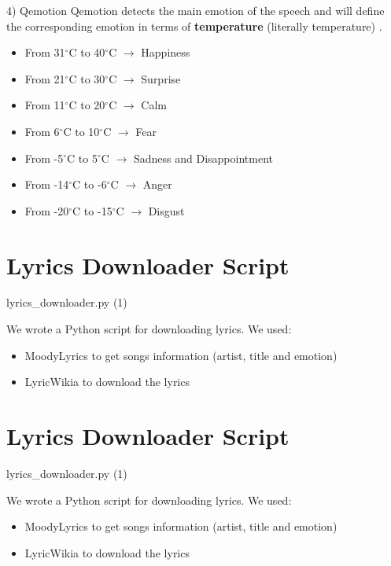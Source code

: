 \documentclass[xcolor=dvipsnames]{beamer}
\begin{document}
\begin{frame}{4) Qemotion}
Qemotion detects the main emotion of the speech and will define the corresponding emotion in terms of \textbf{temperature} (literally temperature) \cite{p5}.
\begin{itemize}
\item From 31$^\circ$C to 40$^\circ$C $\rightarrow$ Happiness
\item From 21$^\circ$C to 30$^\circ$C $\rightarrow$ Surprise
\item From 11$^\circ$C to 20$^\circ$C $\rightarrow$ Calm
\item From 6$^\circ$C to 10$^\circ$C $\rightarrow$ Fear
\item From -5$^\circ$C to 5$^\circ$C $\rightarrow$ Sadness and Disappointment
\item From -14$^\circ$C to -6$^\circ$C $\rightarrow$ Anger
\item From -20$^\circ$C to -15$^\circ$C $\rightarrow$ Disgust
\end{itemize}
\end{frame}

\section{Lyrics Downloader Script}
\begin{frame}{lyrics\_downloader.py (1)}

We wrote a Python script for downloading lyrics. We used:
\begin{itemize}
\item MoodyLyrics to get songs information (artist, title and emotion)
\item LyricWikia to download the lyrics
\end{itemize}

\end{frame}

\section{Lyrics Downloader Script}
\begin{frame}{lyrics\_downloader.py (1)}

We wrote a Python script for downloading lyrics. We used:
\begin{itemize}
\item MoodyLyrics to get songs information (artist, title and emotion)
\item LyricWikia to download the lyrics
\end{itemize}

\end{frame}
\end{document}
